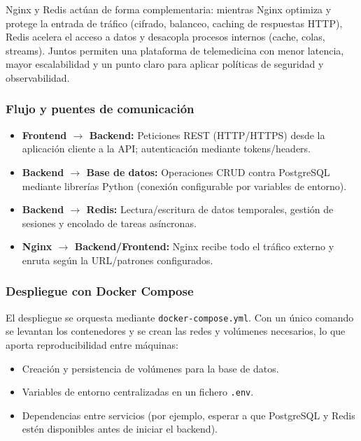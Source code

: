 \documentclass[12pt, a4paper]{article}
\begin{document}
Nginx y Redis actúan de forma complementaria: mientras Nginx optimiza y protege la entrada de tráfico (cifrado, balanceo, caching de respuestas HTTP), Redis acelera el acceso a datos y desacopla procesos internos (cache, colas, streams). Juntos permiten una plataforma de telemedicina con menor latencia, mayor escalabilidad y un punto claro para aplicar políticas de seguridad y observabilidad. \cite{nginx_reverseproxy,nginx_loadbalancer,redis_pubsub}


\subsubsection{Flujo y puentes de comunicación}
\begin{itemize}
	\item \textbf{Frontend \(\rightarrow\) Backend:} Peticiones REST (HTTP/HTTPS) desde la aplicación cliente a la API; autenticación mediante tokens/headers.
	\item \textbf{Backend \(\rightarrow\) Base de datos:} Operaciones CRUD contra PostgreSQL mediante librerías Python (conexión configurable por variables de entorno).
	\item \textbf{Backend \(\rightarrow\) Redis:} Lectura/escritura de datos temporales, gestión de sesiones y encolado de tareas asíncronas.
	\item \textbf{Nginx \(\rightarrow\) Backend/Frontend:} Nginx recibe todo el tráfico externo y enruta según la URL/patrones configurados.
\end{itemize}



\subsubsection{Despliegue con Docker Compose}
El despliegue se orquesta mediante \texttt{docker-compose.yml}. Con un único comando se levantan los contenedores y se crean las redes y volúmenes necesarios, lo que aporta reproducibilidad entre máquinas:
\begin{itemize}
	\item Creación y persistencia de volúmenes para la base de datos.
	\item Variables de entorno centralizadas en un fichero \texttt{.env}.
	\item Dependencias entre servicios (por ejemplo, esperar a que PostgreSQL y Redis estén disponibles antes de iniciar el backend).
\end{itemize}
\end{document}
